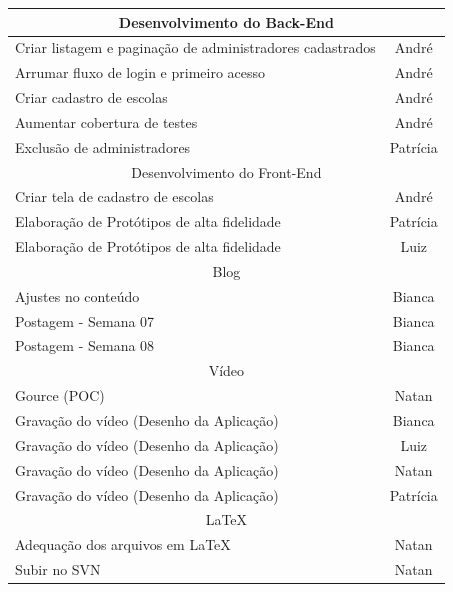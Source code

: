 \begin{apendicesenv}
\begin{quadro}[htb]
\begin{tabular}{|l|c|}
    \multicolumn{2}{|c|}{Desenvolvimento do Back-End} \\ \hline
    Criar listagem e paginação de administradores cadastrados & André    \\ \hline   
    Arrumar fluxo de login e primeiro acesso & André    \\ \hline 
    Criar cadastro de escolas & André    \\ \hline   
    Aumentar cobertura de testes & André    \\ \hline  
    Exclusão de administradores & Patrícia   \\ \hline 
    
    \multicolumn{2}{|c|}{Desenvolvimento do Front-End} \\ \hline
    Criar tela de cadastro de escolas & André   \\ \hline 
    Elaboração de Protótipos de alta fidelidade & Patrícia   \\ \hline 
    Elaboração de Protótipos de alta fidelidade & Luiz  \\ \hline 
    
    \multicolumn{2}{|c|}{Blog} \\ \hline
    Ajustes no conteúdo  & Bianca      \\ \hline
    Postagem - Semana 07      & Bianca     \\ \hline
    Postagem - Semana 08      & Bianca      \\ \hline
    
    \multicolumn{2}{|c|}{Vídeo} \\ \hline
    Gource (POC) & Natan   \\ \hline 
    Gravação do vídeo (Desenho da Aplicação) & Bianca     \\ \hline
    Gravação do vídeo (Desenho da Aplicação) & Luiz   \\ \hline
    Gravação do vídeo (Desenho da Aplicação) & Natan   \\ \hline
    Gravação do vídeo (Desenho da Aplicação) & Patrícia    \\ \hline
    
    \multicolumn{2}{|c|}{LaTeX} \\ \hline
    Adequação dos arquivos em LaTeX & Natan   \\ \hline 
    Subir no SVN & Natan   \\ \hline
    
\end{tabular}
\end{quadro}
\FloatBarrier


\end{apendicesenv}
